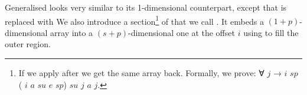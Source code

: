 Generalised  looks very similar to its 1-dimensional
counterpart, except that  is replaced with 
We also introduce a section\footnote{
If we apply  after  we get the same array back.
Formally, we prove: ∀ $j$ →  $i$ $sp$ (
$i$ $a$ $su$ $e$ $sp$) $su$ $j$  $a$ $j$.
}
of  that we call .
It embeds a $(1+p)$-dimensional array into a $(s+p)$-dimensional
one at the offset $i$ using  to fill the outer region.
\begin{mathpar}
\end{mathpar}
